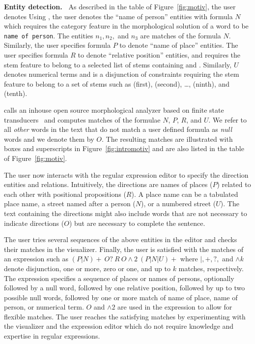 
{\bf Entity detection.~}
As described in the table of Figure~\ref{fig:motiv}, the user denotes 
Using \framework, the user denotes the ``name of person'' entities with formula $N$ 
which requires the category feature in the morphological solution of a word
to be {\tt name of person}. 
The entities $n_1,n_2,$ and $n_3$ are matches of the formula $N$. 
Similarly, the user specifies formula $P$ to denote ``name of place'' entities. 
The user specifies formula 
$R$ to denote ``relative position'' entities, and requires the stem feature to belong 
to a selected list of 
stems containing  and . 
Similarly, $U$ denotes numerical terms and is a disjunction of constraints 
requiring the stem feature to belong to a set of stems such as
(first), (second), \dots, (ninth), and (tenth).

\framework calls an inhouse open source morphological 
analyzer based on finite state transducers~\cite{ZaMaColing2012DemosSarf} and computes matches of 
the formulae $N$, $P$, $R$, and $U$. 
We refer to all {\em other} words in the text that do not match 
a user defined formula as {\em null} words and we denote them by $O$. 
The resulting matches are illustrated with boxes and superscripts 
in Figure~\ref{fig:intromotiv} and are also listed in the table of 
Figure~\ref{fig:motiv}.

The user now interacts with the regular expression editor to 
specify the direction entities and relations.
Intuitively, 
the directions are names of places ($P$) related to each other with 
positional propositions ($R$). 
A place name can be a tabulated place name, a street named after 
a person ($N$), or a numbered street ($U$). 
The text containing the directions might also include words that are not 
necessary to indicate directions ($O$)
but are necessary to complete the sentence. 

The user tries several sequences of the above entities in the 
editor and checks their matches in the visualizer. 
Finally, the user is satisfied with the matches of an expression such as 
$(P|N)+~O?~R~O\wedge 2~(P|N|U)+$ where 
$|,+,?,$ and $\wedge k$ denote disjunction, one or more, zero or one, and
up to $k$ matches, respectively.
The expression specifies a sequence of places or names of persons, 
optionally followed by a null word, 
followed by one relative position, followed by up to two possible null words, 
followed by one or more match of name of place, name of person, or numerical term. 
$O$ and $\wedge 2$ are used in the expression to allow for flexible matches. 
The user reaches the satisfying matches by experimenting with the visualizer and 
the expression editor which do not
require knowledge and expertise in regular expressions. 

